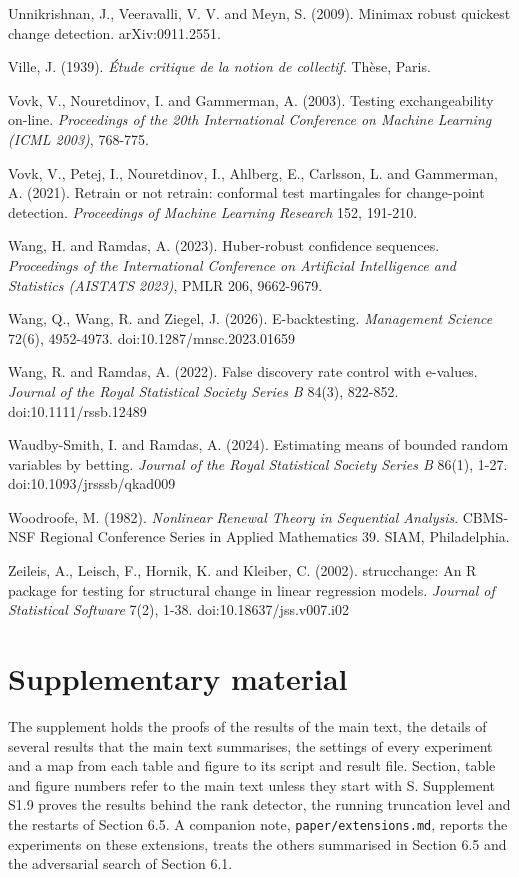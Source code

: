 \documentclass[
]{article}
\begin{document}
Unnikrishnan, J., Veeravalli, V. V. and Meyn, S. (2009). Minimax robust
quickest change detection. arXiv:0911.2551.

Ville, J. (1939). \emph{Étude critique de la notion de collectif}.
Thèse, Paris.

Vovk, V., Nouretdinov, I. and Gammerman, A. (2003). Testing
exchangeability on-line. \emph{Proceedings of the 20th International
Conference on Machine Learning (ICML 2003)}, 768-775.

Vovk, V., Petej, I., Nouretdinov, I., Ahlberg, E., Carlsson, L. and
Gammerman, A. (2021). Retrain or not retrain: conformal test martingales
for change-point detection. \emph{Proceedings of Machine Learning
Research} 152, 191-210.

Wang, H. and Ramdas, A. (2023). Huber-robust confidence sequences.
\emph{Proceedings of the International Conference on Artificial
Intelligence and Statistics (AISTATS 2023)}, PMLR 206, 9662-9679.

Wang, Q., Wang, R. and Ziegel, J. (2026). E-backtesting.
\emph{Management Science} 72(6), 4952-4973. doi:10.1287/mnsc.2023.01659

Wang, R. and Ramdas, A. (2022). False discovery rate control with
e-values. \emph{Journal of the Royal Statistical Society Series B}
84(3), 822-852. doi:10.1111/rssb.12489

Waudby-Smith, I. and Ramdas, A. (2024). Estimating means of bounded
random variables by betting. \emph{Journal of the Royal Statistical
Society Series B} 86(1), 1-27. doi:10.1093/jrsssb/qkad009

Woodroofe, M. (1982). \emph{Nonlinear Renewal Theory in Sequential
Analysis}. CBMS-NSF Regional Conference Series in Applied Mathematics
39. SIAM, Philadelphia.

Zeileis, A., Leisch, F., Hornik, K. and Kleiber, C. (2002). strucchange:
An R package for testing for structural change in linear regression
models. \emph{Journal of Statistical Software} 7(2), 1-38.
doi:10.18637/jss.v007.i02

\hypertarget{supplementary-material}{%
\section{Supplementary material}\label{supplementary-material}}

The supplement holds the proofs of the results of the main text, the
details of several results that the main text summarises, the settings
of every experiment and a map from each table and figure to its script
and result file. Section, table and figure numbers refer to the main
text unless they start with S. Supplement S1.9 proves the results behind
the rank detector, the running truncation level and the restarts of
Section 6.5. A companion note, \texttt{paper/extensions.md}, reports the
experiments on these extensions, treats the others summarised in Section
6.5 and the adversarial search of Section 6.1.
\end{document}
